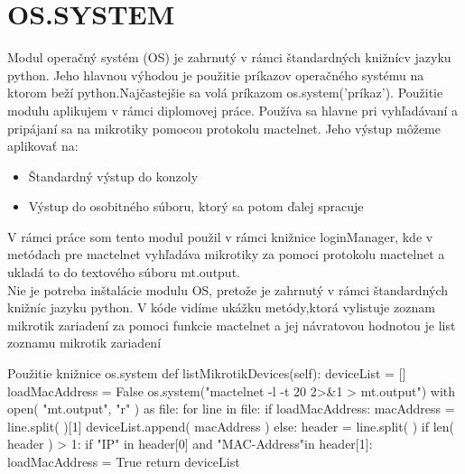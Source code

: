 \section{OS.SYSTEM}
Modul operačný systém (OS) \cite{OS} je zahrnutý v rámci štandardných knižnícv jazyku python. Jeho hlavnou výhodou je použitie príkazov operačného systému na ktorom beží python.Najčastejšie sa volá príkazom os.system('príkaz').
Použitie modulu aplikujem v rámci diplomovej práce. Používa sa hlavne pri vyhľadávaní a pripájaní sa na mikrotiky pomocou protokolu mactelnet. Jeho výstup môžeme aplikovať na:\begin{itemize}
\item Štandardný výstup do konzoly
\item Výstup do osobitného súboru, ktorý sa potom ďalej spracuje
\end{itemize}
V rámci práce som tento modul použil v rámci knižnice loginManager, kde v metódach pre mactelnet vyhľadáva mikrotiky za pomoci protokolu mactelnet a ukladá to do textového súboru mt.output. \\
Nie je potreba inštalácie modulu  OS, pretože je zahrnutý v rámci štandardných knižníc jazyku python. V kóde vidíme ukážku metódy,ktorá vylistuje zoznam mikrotik zariadení za pomoci funkcie mactelnet a jej návratovou hodnotou je list zoznamu mikrotik zariadení
\\
\begin{sexylisting}{Použitie knižnice os.system}
def listMikrotikDevices(self):
 deviceList = []
 loadMacAddress = False
 os.system("mactelnet -l -t 20 2>&1 > mt.output")
 with open( "mt.output", "r" ) as file:
 for line in file:
  if loadMacAddress:
   macAddress = line.split( )[1]
   deviceList.append( macAddress )
  else:
   header = line.split( )
    if len( header ) > 1:
     if "IP" in header[0] and "MAC-Address"in header[1]:
      loadMacAddress = True
 return deviceList
\end{sexylisting}
